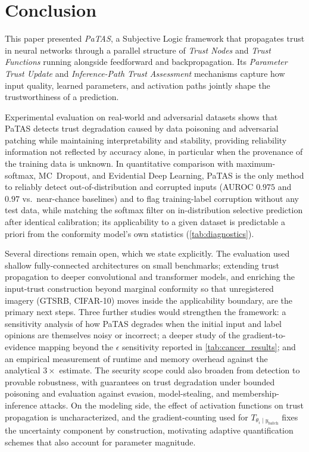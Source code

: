 \vspace{-0.5em}
\section{Conclusion}\label{sec:conclusion}
This paper presented \emph{PaTAS}, a Subjective Logic framework that propagates trust in neural networks through a parallel structure of \emph{Trust Nodes} and \emph{Trust Functions} running alongside feedforward and backpropagation. Its \emph{Parameter Trust Update} and \emph{Inference-Path Trust Assessment} mechanisms capture how input quality, learned parameters, and activation paths jointly shape the trustworthiness of a prediction.

Experimental evaluation on real-world and adversarial datasets shows that PaTAS detects trust degradation caused by data poisoning and adversarial patching while maintaining interpretability and stability, providing reliability information not reflected by accuracy alone, in particular when the provenance of the training data is unknown. In quantitative comparison with maximum-softmax, MC~Dropout, and Evidential Deep Learning, PaTAS is the only method to reliably detect out-of-distribution and corrupted inputs (AUROC $0.975$ and $0.97$ vs.\ near-chance baselines) and to flag training-label corruption without any test data, while matching the softmax filter on in-distribution selective prediction after identical calibration; its applicability to a given dataset is predictable a priori from the conformity model's own statistics (\cref{tab:diagnostics}).

Several directions remain open, which we state explicitly. The evaluation used shallow fully-connected architectures on small benchmarks; extending trust propagation to deeper convolutional and transformer models, and enriching the input-trust construction beyond marginal conformity so that unregistered imagery (GTSRB, CIFAR-10) moves inside the applicability boundary, are the primary next steps. Three further studies would strengthen the framework: a sensitivity analysis of how PaTAS degrades when the initial input and label opinions are themselves noisy or incorrect; a deeper study of the gradient-to-evidence mapping beyond the $\epsilon$ sensitivity reported in \cref{tab:cancer_results}; and an empirical measurement of runtime and memory overhead against the analytical $3\times$ estimate. The security scope could also broaden from detection to provable robustness, with guarantees on trust degradation under bounded poisoning and evaluation against evasion, model-stealing, and membership-inference attacks. On the modeling side, the effect of activation functions on trust propagation is uncharacterized, and the gradient-counting used for \(T_{\theta_i \mid y_\text{batch}}\) fixes the uncertainty component by construction, motivating adaptive quantification schemes that also account for parameter magnitude.
